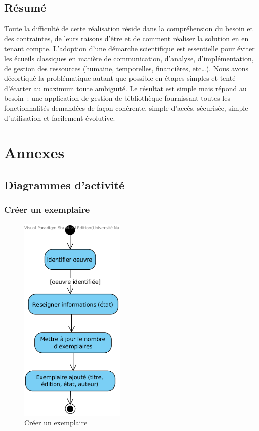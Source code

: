 \documentclass[a4paper,12pt]{article}
\begin{document}
\subsection{Résumé}
\label{sec:orgheadline19}

Toute la difficulté de cette réalisation réside dans la compréhension du
besoin et des contraintes, de leurs raisons d’être et de comment réaliser la
solution en en tenant compte. L’adoption d’une démarche scientifique est
essentielle pour éviter les écueils classiques en matière de communication,
d’analyse, d’implémentation, de gestion des ressources (humaine, temporelles,
financières, etc\ldots{}). Nous avons décortiqué la problématique autant que
possible en étapes simples et tenté d’écarter au maximum toute ambiguïté. Le
résultat est simple mais répond au besoin : une application de gestion de
bibliothèque fournissant toutes les fonctionnalités demandées de façon
cohérente, simple d’accès, sécurisée, simple d’utilisation et facilement
évolutive.


\clearpage
\section{Annexes}
\label{sec:orgheadline30}
\subsection{Diagrammes d’activité}
\label{sec:orgheadline29}
\subsubsection{Créer un exemplaire}
\label{sec:orgheadline21}

\begin{figure}[!htpb]
\centering
\includegraphics[width=5cm]{./res/img/ajouter-un-exemplaire.png}
\caption{\label{fig:orgparagraph12}
Créer un exemplaire}
\end{figure}
\end{document}

